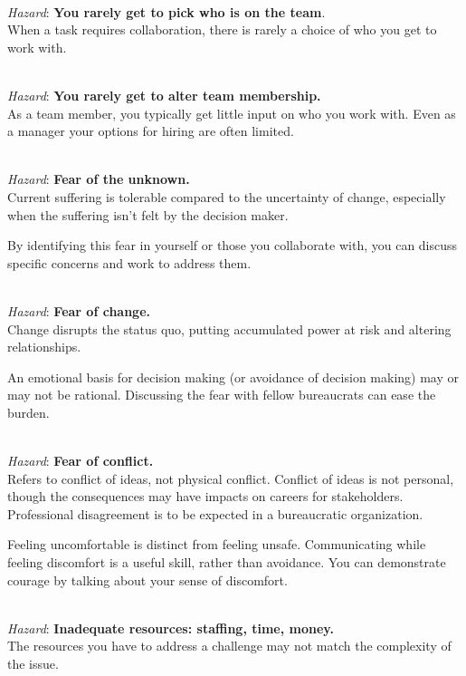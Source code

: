 \ \\
\textit{Hazard}: \textbf{You rarely get to pick who is on the team}. \\
When a task requires collaboration, there is rarely a choice of who you get to work with. 

\ \\
\textit{Hazard}: \textbf{You rarely get to alter team membership.}\\
As a team member, you typically get little input on who you work with. Even as a manager your options for hiring are often limited. 

\ \\
\textit{Hazard}: \textbf{Fear of the unknown.}\\
Current suffering is tolerable compared to the uncertainty of change, especially when the suffering isn't felt by the decision maker.

By identifying this fear in yourself or those you collaborate with, you can discuss specific concerns and work to address them.

\ \\
\textit{Hazard}: \textbf{Fear of change.} \\
Change disrupts the status quo, putting accumulated power at risk and altering relationships. 

An emotional basis for decision making (or avoidance of decision making) may or may not be rational. Discussing the fear with fellow bureaucrats can ease the burden. 

\ \\
\textit{Hazard}: \textbf{Fear of conflict.}\\
Refers to conflict of ideas, not physical conflict. Conflict of ideas is not personal, though the consequences may have impacts on careers for stakeholders. \\
Professional disagreement is to be expected in a bureaucratic organization.

Feeling uncomfortable is distinct from feeling unsafe. Communicating while feeling discomfort is a useful skill, rather than avoidance. You can demonstrate courage by talking about your sense of discomfort. 

\ \\
\textit{Hazard}: \textbf{Inadequate resources: staffing, time, money.}\\
The resources you have to address a challenge may not match the complexity of the issue.

